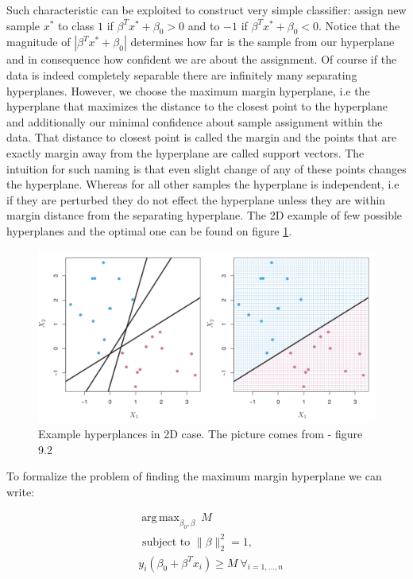 \documentclass[shortabstract, english, mgr]{iithesis}
\DeclareMathOperator*{\argmax}{arg\,max}
\begin{document}
Such characteristic can be exploited to construct very simple classifier: assign new sample $x^*$ to class $1$ if $\beta^T x^* + \beta_0 > 0$ and to $-1$ if $\beta^T x^* + \beta_0 < 0$. Notice that the magnitude of $|\beta^T x^* + \beta_0|$ determines how far is the sample from our hyperplane and in consequence how confident we are about the assignment. Of course if the data is indeed completely separable there are infinitely many separating hyperplanes. However, we choose the maximum margin hyperplane, i.e the hyperplane that maximizes the distance to the closest point to the hyperplane and additionally our minimal confidence about sample assignment within the data. That distance to closest point is called the margin and the points that are exactly margin away from the hyperplane are called support vectors. The intuition for such naming is that even slight change of any of these points changes the hyperplane. Whereas for all other samples the hyperplane is independent, i.e if they are perturbed they do not effect the hyperplane unless they are within margin distance from the separating hyperplane. The 2D example of few possible hyperplanes and the optimal one can be found on figure \ref{fig:svc-hyper}.

\begin{figure}
\centering
\includegraphics[width=\textwidth]{images/svc-hyper.png}
\caption{Example hyperplances in 2D case. The picture comes from \cite{ISL} - figure 9.2}
\label{fig:svc-hyper}
\end{figure}

To formalize the problem of finding the maximum margin hyperplane we can write:

\begin{align*}
&{\argmax_{\beta_{0}, \beta} \ M} \\ &{\text { subject to } \|\beta\|_2^2 = 1}, \\ &{y_{i}\left(\beta_{0}+\beta^T x_i\right) \geq M \ \forall_{i=1, \ldots, n}}
\end{align*}
\end{document}
